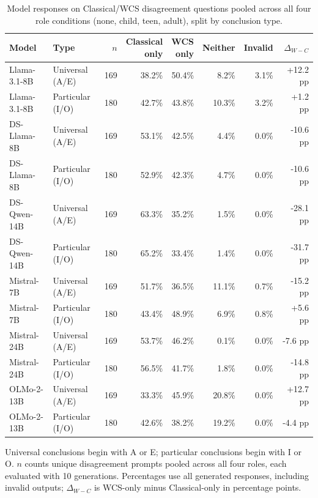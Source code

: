\begin{table}[htbp]
\centering
\scriptsize
\setlength{\tabcolsep}{3pt}
\caption{Model responses on Classical/WCS disagreement questions pooled across all four role conditions (none, child, teen, adult), split by conclusion type.}
\label{tab:alignment-by-conclusion-type}
\begin{tabular}{llrrrrrr}
\toprule
Model & Type & $n$ & \shortstack{Classical\\only} & \shortstack{WCS\\only} & Neither & Invalid & $\Delta_{W-C}$ \\
\midrule
Llama-3.1-8B & Universal (A/E) & 169 & 38.2\% & 50.4\% & 8.2\% & 3.1\% & +12.2 pp \\
Llama-3.1-8B & Particular (I/O) & 180 & 42.7\% & 43.8\% & 10.3\% & 3.2\% & +1.2 pp \\
DS-Llama-8B & Universal (A/E) & 169 & 53.1\% & 42.5\% & 4.4\% & 0.0\% & -10.6 pp \\
DS-Llama-8B & Particular (I/O) & 180 & 52.9\% & 42.3\% & 4.7\% & 0.0\% & -10.6 pp \\
DS-Qwen-14B & Universal (A/E) & 169 & 63.3\% & 35.2\% & 1.5\% & 0.0\% & -28.1 pp \\
DS-Qwen-14B & Particular (I/O) & 180 & 65.2\% & 33.4\% & 1.4\% & 0.0\% & -31.7 pp \\
Mistral-7B & Universal (A/E) & 169 & 51.7\% & 36.5\% & 11.1\% & 0.7\% & -15.2 pp \\
Mistral-7B & Particular (I/O) & 180 & 43.4\% & 48.9\% & 6.9\% & 0.8\% & +5.6 pp \\
Mistral-24B & Universal (A/E) & 169 & 53.7\% & 46.2\% & 0.1\% & 0.0\% & -7.6 pp \\
Mistral-24B & Particular (I/O) & 180 & 56.5\% & 41.7\% & 1.8\% & 0.0\% & -14.8 pp \\
OLMo-2-13B & Universal (A/E) & 169 & 33.3\% & 45.9\% & 20.8\% & 0.0\% & +12.7 pp \\
OLMo-2-13B & Particular (I/O) & 180 & 42.6\% & 38.2\% & 19.2\% & 0.0\% & -4.4 pp \\
\bottomrule
\end{tabular}
\vspace{2pt}
\begin{minipage}{\linewidth}
\scriptsize Universal conclusions begin with A or E; particular conclusions begin with I or O. $n$ counts unique disagreement prompts pooled across all four roles, each evaluated with 10 generations. Percentages use all generated responses, including invalid outputs; $\Delta_{W-C}$ is WCS-only minus Classical-only in percentage points.
\end{minipage}
\end{table}
